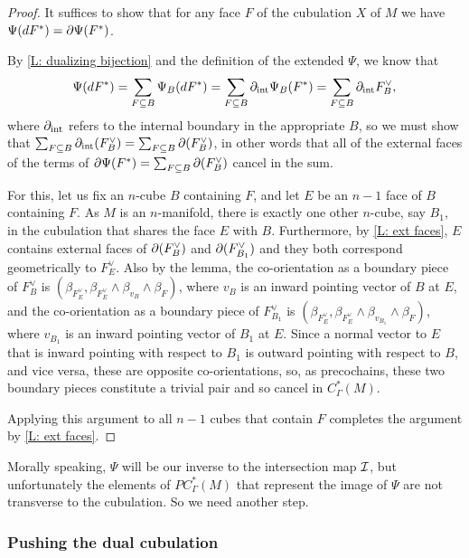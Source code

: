 \begin{proof}
	It suffices to show that for any face $F$ of the cubulation $X$ of $M$ we have $\Psi(d F^*) = \partial\Psi(F^*)$.

	By \cref{L: dualizing bijection} and the definition of the extended $\Psi$, we know that
	$$\Psi(dF^*) = \sum_{F \subseteq B} \Psi_B(dF^*) = \sum_{F \subseteq B}\partial_{\text{int}} \Psi_B(F^*) = \sum_{F \subseteq B} \partial_{\text{int}}F^\vee_B,$$
	where $\partial_{\text{int}}$ refers to the internal boundary in the appropriate $B$, so we must show that $\sum_{F \subseteq B} \partial_{\text{int}}(F^\vee_B) = \sum_{F \subseteq B} \partial (F^\vee_B)$, in other words that all of the external faces of the terms of $\partial\Psi(F^*) = \sum_{F \subseteq B} \partial (F^\vee_B)$ cancel in the sum.

	For this, let us fix an $n$-cube $B$ containing $F$, and let $E$ be an $n-1$ face of $B$ containing $F$.
	As $M$ is an $n$-manifold, there is exactly one other $n$-cube, say $B_1$, in the cubulation that shares the face $E$ with $B$.
	Furthermore, by \cref{L: ext faces}, $E$ contains external faces of $\partial(F^\vee_B)$ and $\partial(F^\vee_{B_1})$ and they both correspond geometrically to $F^\vee_E$.
	Also by the lemma, the co-orientation as a boundary piece of $F^\vee_B$ is $(\beta_{F_E^\vee},\beta_{F_E^\vee} \wedge \beta_{v_B} \wedge \beta_F)$, where $v_B$ is an inward pointing vector of $B$ at $E$, and the co-orientation as a boundary piece of $F^\vee_{B_1}$ is $(\beta_{F_E^\vee},\beta_{F_E^\vee} \wedge \beta_{v_{B_1}} \wedge \beta_F)$, where $v_{B_1}$ is an inward pointing vector of $B_1$ at $E$.
	Since a normal vector to $E$ that is inward pointing with respect to $B_1$ is outward pointing with respect to $B$, and vice versa, these are opposite co-orientations, so, as precochains, these two boundary pieces constitute a trivial pair and so cancel in $C^*_\Gamma(M)$.

	Applying this argument to all $n-1$ cubes that contain $F$ completes the argument by \cref{L: ext faces}.
\end{proof}

Morally speaking, $\Psi$ will be our inverse to the intersection map $\mathcal{I}$, but unfortunately the elements of $PC^*_\Gamma(M)$ that represent the image of $\Psi$ are not transverse to the cubulation.
So we need another step.

\subsubsection{Pushing the dual cubulation}

